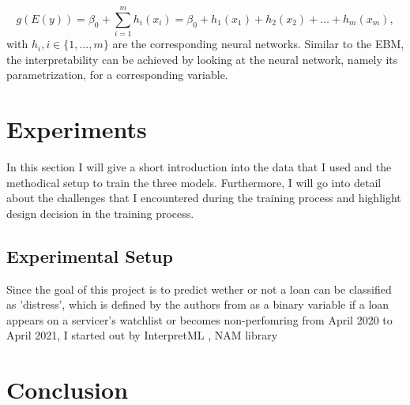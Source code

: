 \documentclass{article}
\begin{document}
\begin{equation}
g(E(y)) = \beta_0 + \sum_{i=1}^{m} h_i(x_i) = \beta_0 + h_1(x_1) + h_2(x_2) + \dots + h_m(x_m),
\end{equation}
with $h_i, i \in \{1,\dots, m\}$ are the corresponding neural networks.
Similar to the EBM, the interpretability can be achieved by looking at the neural network, namely its parametrization, for a corresponding variable. \cite{nazemi2022interpretable}
\section{Experiments}
In this section I will give a short introduction into the data that I used and the methodical setup to train the three models. Furthermore, I will go into detail about the challenges that I encountered during the training process and highlight design decision in the training process.
\subsection{Experimental Setup}
Since the goal of this project is to predict wether or not a loan can be classified as 'distress', which is defined by the authors from \cite{CMBS-Paper} as a binary variable if a loan appears on a servicer's watchlist or becomes non-perfomring from April 2020 to April 2021, I started out by 
InterpretML \cite{InterpretML}, NAM library \cite{NAM-Library1, NAM-Library2}



\section{Conclusion}



\end{document}
